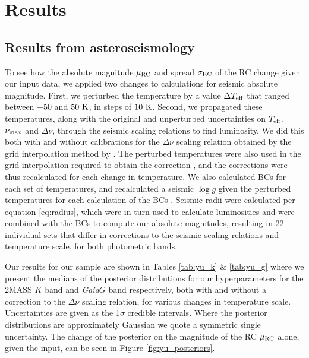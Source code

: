 \documentclass[fleqn,usenatbib]{mnras}
\newcommand{\numax}{\mbox{$\nu_{\rm max}$}\xspace}
\newcommand{\dnu}{\mbox{$\Delta \nu$}\xspace}
\newcommand{\teff}{\mbox{$T_{\rm eff}$}\xspace}
\newcommand{\logg}{\mbox{$\log g$}\xspace}
\newcommand{\gaia}{\emph{Gaia}\xspace}
\newcommand{\up}[1]{#1}
\begin{document}
\section{Results} \label{sec:results}
\subsection{Results from asteroseismology}
To see how the absolute magnitude $\mu_{\rm RC}$ and spread $\sigma_{\rm RC}$ of the RC change given our input data, we applied two changes to calculations for seismic absolute magnitude. First, we perturbed the temperature by a value $\Delta T_{\rm eff}$ that ranged between $-50$ and $50\ \rm{K}$, in steps of $10\ \rm{K}$. Second, we propagated these temperatures, along with the original and unperturbed uncertainties on \teff, \numax and \dnu, through the seismic scaling relations to find luminosity. We did this both with and without calibrations for the \dnu scaling relation obtained by the grid interpolation method by \cite{art:sharma+2016}. The perturbed temperatures were also used in the grid interpolation required to obtain the correction \citep{art:sharma+stello2016}, and the corrections were thus recalculated for each change in temperature. We also calculated BCs for each set of temperatures, and recalculated a seismic \logg given the perturbed temperatures for each calculation of the BCs \citep{art:casagrande+vandenberg2014, art:casagrande+vandenberg2018b, art:casagrande+vandenberg2018}. \up{Seismic radii were calculated per equation \ref{eq:radius}, which were in turn used to calculate luminosities and were combined with the BCs to compute our absolute magnitudes, resulting in 22 individual sets that differ in corrections to the seismic scaling relations and temperature scale, for both photometric bands.}

\up{Our results for our  sample are shown in Tables \ref{tab:yu_k} \& \ref{tab:yu_g} where} we present the medians of the posterior distributions for our hyperparameters for the 2MASS $K$ band and \gaia $G$ band respectively, both with and without a correction to the \dnu scaling relation, for various changes in temperature scale. Uncertainties are given as the 1$\sigma$ credible intervals. Where the posterior distributions are approximately Gaussian we quote a symmetric single uncertainty. The change of the posterior on the magnitude of the RC $\mu_{\rm RC}$ alone, given the input, can be seen in Figure \ref{fig:yu_posteriors}.
\end{document}
